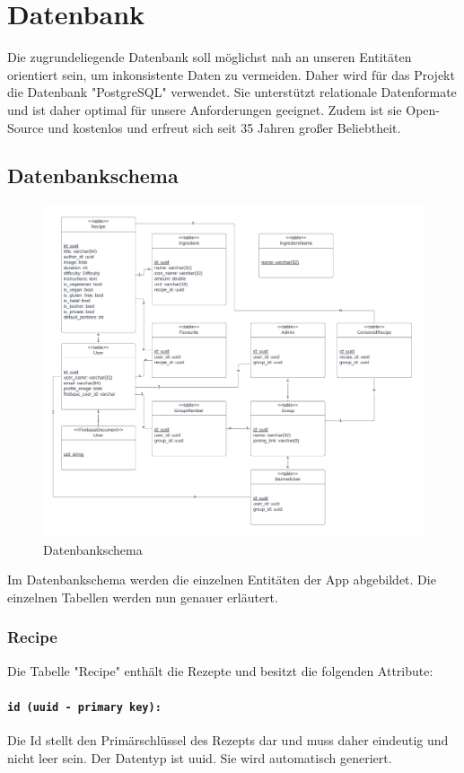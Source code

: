 \documentclass{entwurfsheft}
\begin{document}
\section{Datenbank}
Die zugrundeliegende Datenbank soll möglichst nah an unseren Entitäten orientiert sein, um inkonsistente Daten zu vermeiden. Daher wird für das Projekt die Datenbank "PostgreSQL" verwendet. Sie unterstützt relationale Datenformate und ist daher optimal für unsere Anforderungen geeignet. Zudem ist sie Open-Source und kostenlos und erfreut sich seit 35 Jahren großer Beliebtheit.
\subsection{Datenbankschema}
\begin{figure}[htp]
    \centering
    \includegraphics[width = \linewidth]{images/database/databaseSchema.pdf}
    \caption{Datenbankschema}
\end{figure}
Im Datenbankschema werden die einzelnen Entitäten der App abgebildet. Die einzelnen Tabellen werden nun genauer erläutert.
\newpage
\subsubsection{Recipe}
Die Tabelle "Recipe" enthält die Rezepte und besitzt die folgenden Attribute:
\paragraph{\texttt{id (uuid - primary key):}} Die Id stellt den Primärschlüssel des Rezepts dar und muss daher eindeutig und nicht leer sein. Der Datentyp ist \Gls{uuid}. Sie wird automatisch generiert.
\end{document}
